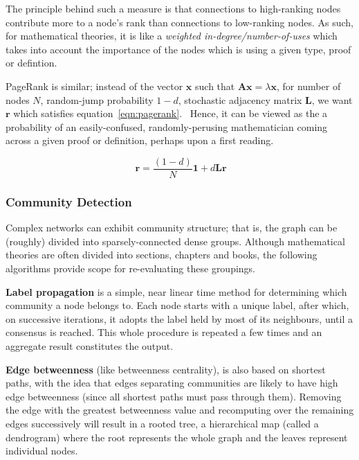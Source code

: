 The principle behind such a measure is that connections to high-ranking nodes
contribute more to a node's rank than connections to low-ranking nodes.  As
such, for mathematical theories, it is like a \emph{weighted
in-degree/number-of-uses} which takes into account the importance of the nodes
which is using a given type, proof or defintion.

PageRank is similar; instead of the vector $\mathbf{x}$ such that $\mathbf{Ax}
= \lambda\mathbf{x}$, for number of nodes $N$, random-jump probability $1-d$,
stochastic adjacency matrix $\mathbf{L}$, we want $\mathbf{r}$ which satisfies
equation~\ref{eqn:pagerank}.~\cite{page1999} Hence, it can be viewed as the a
probability of an easily-confused, randomly-perusing mathematician coming
across a given proof or definition, perhaps upon a first reading.

\begin{equation}~\label{eqn:pagerank}
  \mathbf{r} = \frac{\left(1-d\right)}{N} \mathbf{1} + d\mathbf{Lr}
\end{equation}

\subsubsection{Community Detection}

Complex networks can exhibit community structure; that is, the graph can be
(roughly) divided into sparsely-connected dense groups. Although mathematical
theories are often divided into sections, chapters and books, the following
algorithms provide scope for re-evaluating these groupings.

\textbf{Label propagation} is a simple, near linear time method for
determining which community a node belongs to. Each node starts with a unique
label, after which, on successive iterations, it adopts the label held by most
of its neighbours, until a consensus is reached. This whole procedure is
repeated a few times and an aggregate result constitutes the
output.~\cite{raghavan2007}

\textbf{Edge betweenness} (like betweenness centrality), is also based on
shortest paths, with the idea that edges separating communities are likely to
have high edge betweenness (since all shortest paths must pass through them).
Removing the edge with the greatest betweenness value and recomputing over the
remaining edges successively will result in a rooted tree, a hierarchical map
(called a dendrogram) where the root represents the whole graph and the leaves
represent individual nodes.~\cite{newman2004}

